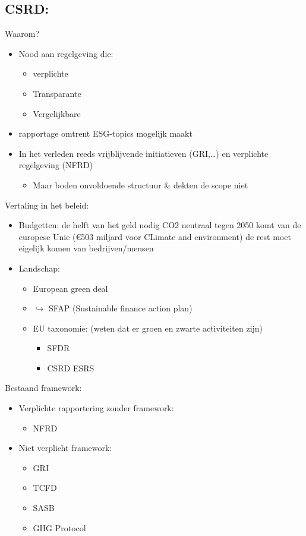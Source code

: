 \documentclass[12pt]{article}
\begin{document}
\subsection{CSRD:}
Waarom?\begin{itemize}
    \item Nood aan regelgeving die:\begin{itemize}
        \item verplichte 
        \item Transparante 
        \item Vergelijkbare
    \end{itemize}
    \item[]rapportage omtrent ESG-topics mogelijk maakt
    \item In het verleden reeds vrijblijvende initiatieven (GRI,\dots) en verplichte regelgeving (NFRD)\begin{itemize}
        \item Maar boden onvoldoende structuur \& dekten de scope niet
    \end{itemize}
\end{itemize}
Vertaling in het beleid:\begin{itemize}
    \item Budgetten: de helft van het geld nodig CO2 neutraal tegen 2050 komt van de europese Unie (€503 miljard voor CLimate and environment) de rest moet eigelijk komen van bedrijven/mensen 
    \item Landschap:\begin{itemize}
        \item European green deal 
        \item $\hookrightarrow$ SFAP (Sustainable finance action plan)
        \item EU taxonomie: (weten dat er groen en zwarte activiteiten zijn)\begin{itemize}
            \item SFDR 
            \item CSRD ESRS
        \end{itemize}
    \end{itemize}
\end{itemize}
Bestaand framework:\begin{itemize}
    \item Verplichte rapportering zonder framework:\begin{itemize}
        \item NFRD 
    \end{itemize}
    \item Niet verplicht framework:\begin{itemize}
        \item GRI 
        \item TCFD 
        \item SASB 
        \item GHG Protocol 
    \end{itemize}
\end{itemize}
\end{document}
